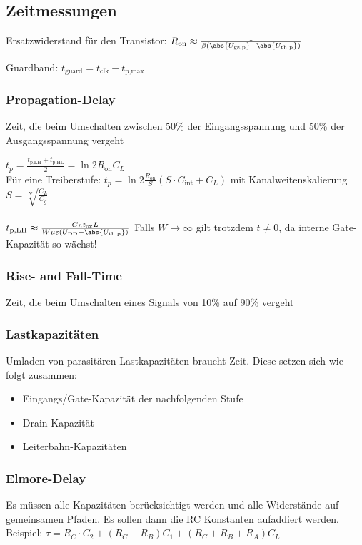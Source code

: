 \documentclass[english]{latex4ei/latex4ei_sheet}
\begin{document}
\subsection{Zeitmessungen}

Ersatzwiderstand für den Transistor: $R_{\text{on}} \approx \frac{1}{\beta (\abs{U_{\text{gs,p}}}-\abs{U_{\text{th,p}}})}$

Guardband: $t_{\text{guard}} = t_{\text{clk}}-t_{\text{p,max}}$

\subsubsection{Propagation-Delay}
Zeit, die beim Umschalten zwischen 50\% der Eingangsspannung und 50\% der Ausgangsspannung vergeht

$t_p = \frac{t_{\text{p,LH}} + t_{\text{p,HL}}}{2} = \ln{2}R_{\text{on}}C_L$\\
Für eine Treiberstufe: $t_p = \ln{2}\frac{R_{\text{on}}}{S}(S\cdot C_{\text{int}} + C_L)$ mit Kanalweitenskalierung $S=\sqrt[N]{\frac{C_L}{C_g}}$\\ \\

$t_{\text{p,LH}} \approx \frac{C_L t_{\text{ox}}L}{W\mu\varepsilon(U_{\text{DD}}-\abs{U_{\text{th,p}}})}$
Falls $W\rightarrow\infty$ gilt trotzdem $t\neq 0$, da interne Gate-Kapazität so wächst!

\subsubsection{Rise- and Fall-Time}
Zeit, die beim Umschalten eines Signals von 10\% auf 90\% vergeht

\subsubsection{Lastkapazitäten}
Umladen von parasitären Lastkapazitäten braucht Zeit.
Diese setzen sich wie folgt zusammen:
\begin{itemize}
	\item Eingangs/Gate-Kapazität der nachfolgenden Stufe
	\item Drain-Kapazität
	\item Leiterbahn-Kapazitäten
\end{itemize}

\subsubsection{Elmore-Delay}
Es müssen alle Kapazitäten berücksichtigt werden und alle Widerstände auf gemeinsamen Pfaden. Es sollen dann die RC Konstanten aufaddiert werden.\\
Beispiel: $\tau = R_C\cdot C_2 + (R_C+R_B)C_1+(R_C+R_B+R_A)C_L$
\end{document}
